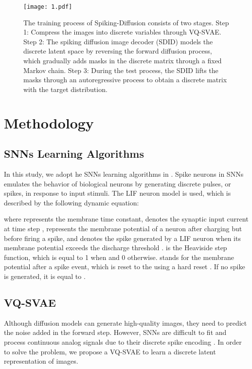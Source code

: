 \documentclass{article}
\begin{document}
\begin{figure*}[htb]
\centering
\texttt{[image: 1.pdf]}
\caption{The training process of Spiking-Diffusion consists of two stages. Step 1: Compress the images into discrete variables through VQ-SVAE. Step 2: The spiking diffusion image decoder (SDID) models the discrete latent space by reversing the forward diffusion process, which gradually adds masks in the discrete matrix through a fixed Markov chain. Step 3: During the test process, the SDID lifts the masks through an autoregressive process to obtain a discrete matrix with the target distribution.}
\label{fig1}
\end{figure*}

\section{Methodology}
\subsection{SNNs Learning Algorithms}
In this study, we adopt he SNNs learning algorithms in \cite{b41}. Spike neurons in SNNs emulates the behavior of biological neurons by generating discrete pulses, or spikes, in response to input stimuli. The LIF neuron model \cite{b42} is used, which is described by the following dynamic equation:



where  represents the membrane time constant,  denotes the synaptic input current at time step ,  represents the membrane potential of a neuron after charging but before firing a spike, and  denotes the spike generated by a LIF neuron when its membrane potential exceeds the discharge threshold .  is the Heaviside step function, which is equal to 1 when  and 0 otherwise.  stands for the membrane potential after a spike event, which is reset to the  using a hard reset \cite{b43}. If no spike is generated, it is equal to .

\subsection{VQ-SVAE}
Although diffusion models \cite{b5} can generate high-quality images, they need to predict the noise added in the forward step. However, SNNs are difficult to fit and process continuous analog signals due to their discrete spike encoding \cite{b26}.  In order to solve the problem, we propose a VQ-SVAE to learn a discrete latent representation of images.
\end{document}
